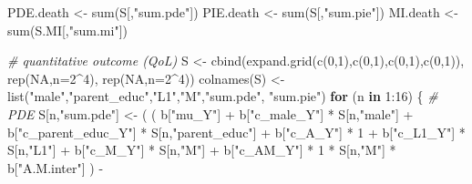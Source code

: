 \documentclass[
]{book}
\newenvironment{Shaded}{\begin{snugshade}}{\end{snugshade}}
\newcommand{\AttributeTok}[1]{\textcolor[rgb]{0.77,0.63,0.00}{#1}}
\newcommand{\CommentTok}[1]{\textcolor[rgb]{0.56,0.35,0.01}{\textit{#1}}}
\newcommand{\ConstantTok}[1]{\textcolor[rgb]{0.00,0.00,0.00}{#1}}
\newcommand{\ControlFlowTok}[1]{\textcolor[rgb]{0.13,0.29,0.53}{\textbf{#1}}}
\newcommand{\DecValTok}[1]{\textcolor[rgb]{0.00,0.00,0.81}{#1}}
\newcommand{\FunctionTok}[1]{\textcolor[rgb]{0.00,0.00,0.00}{#1}}
\newcommand{\NormalTok}[1]{#1}
\newcommand{\OtherTok}[1]{\textcolor[rgb]{0.56,0.35,0.01}{#1}}
\newcommand{\SpecialCharTok}[1]{\textcolor[rgb]{0.00,0.00,0.00}{#1}}
\newcommand{\StringTok}[1]{\textcolor[rgb]{0.31,0.60,0.02}{#1}}
\begin{document}
\begin{Shaded}
\begin{Highlighting}[]
\NormalTok{  PDE.death }\OtherTok{\textless{}{-}} \FunctionTok{sum}\NormalTok{(S[,}\StringTok{"sum.pde"}\NormalTok{])}
\NormalTok{  PIE.death }\OtherTok{\textless{}{-}} \FunctionTok{sum}\NormalTok{(S[,}\StringTok{"sum.pie"}\NormalTok{])}
\NormalTok{  MI.death }\OtherTok{\textless{}{-}} \FunctionTok{sum}\NormalTok{(S.MI[,}\StringTok{"sum.mi"}\NormalTok{])}
  
  
  \CommentTok{\# quantitative outcome (QoL)}
\NormalTok{  S }\OtherTok{\textless{}{-}} \FunctionTok{cbind}\NormalTok{(}\FunctionTok{expand.grid}\NormalTok{(}\FunctionTok{c}\NormalTok{(}\DecValTok{0}\NormalTok{,}\DecValTok{1}\NormalTok{),}\FunctionTok{c}\NormalTok{(}\DecValTok{0}\NormalTok{,}\DecValTok{1}\NormalTok{),}\FunctionTok{c}\NormalTok{(}\DecValTok{0}\NormalTok{,}\DecValTok{1}\NormalTok{),}\FunctionTok{c}\NormalTok{(}\DecValTok{0}\NormalTok{,}\DecValTok{1}\NormalTok{)), }\FunctionTok{rep}\NormalTok{(}\ConstantTok{NA}\NormalTok{,}\AttributeTok{n=}\DecValTok{2}\SpecialCharTok{\^{}}\DecValTok{4}\NormalTok{), }\FunctionTok{rep}\NormalTok{(}\ConstantTok{NA}\NormalTok{,}\AttributeTok{n=}\DecValTok{2}\SpecialCharTok{\^{}}\DecValTok{4}\NormalTok{))}
  \FunctionTok{colnames}\NormalTok{(S) }\OtherTok{\textless{}{-}} \FunctionTok{list}\NormalTok{(}\StringTok{"male"}\NormalTok{,}\StringTok{"parent\_educ"}\NormalTok{,}\StringTok{"L1"}\NormalTok{,}\StringTok{"M"}\NormalTok{,}\StringTok{"sum.pde"}\NormalTok{, }\StringTok{"sum.pie"}\NormalTok{)}
  \ControlFlowTok{for}\NormalTok{ (n }\ControlFlowTok{in} \DecValTok{1}\SpecialCharTok{:}\DecValTok{16}\NormalTok{) \{}
    \CommentTok{\# PDE }
\NormalTok{    S[n,}\StringTok{"sum.pde"}\NormalTok{] }\OtherTok{\textless{}{-}}\NormalTok{ ( ( b[}\StringTok{"mu\_Y"}\NormalTok{] }\SpecialCharTok{+} 
\NormalTok{                            b[}\StringTok{"c\_male\_Y"}\NormalTok{] }\SpecialCharTok{*}\NormalTok{ S[n,}\StringTok{"male"}\NormalTok{] }\SpecialCharTok{+} 
\NormalTok{                            b[}\StringTok{"c\_parent\_educ\_Y"}\NormalTok{] }\SpecialCharTok{*}\NormalTok{ S[n,}\StringTok{"parent\_educ"}\NormalTok{] }\SpecialCharTok{+} 
\NormalTok{                            b[}\StringTok{"c\_A\_Y"}\NormalTok{] }\SpecialCharTok{*} \DecValTok{1} \SpecialCharTok{+} 
\NormalTok{                            b[}\StringTok{"c\_L1\_Y"}\NormalTok{] }\SpecialCharTok{*}\NormalTok{ S[n,}\StringTok{"L1"}\NormalTok{] }\SpecialCharTok{+}
\NormalTok{                            b[}\StringTok{"c\_M\_Y"}\NormalTok{] }\SpecialCharTok{*}\NormalTok{ S[n,}\StringTok{"M"}\NormalTok{] }\SpecialCharTok{+}
\NormalTok{                            b[}\StringTok{"c\_AM\_Y"}\NormalTok{] }\SpecialCharTok{*} \DecValTok{1} \SpecialCharTok{*}\NormalTok{ S[n,}\StringTok{"M"}\NormalTok{] }\SpecialCharTok{*}\NormalTok{ b[}\StringTok{"A.M.inter"}\NormalTok{] ) }\SpecialCharTok{{-}} 

\end{Highlighting}
\end{Shaded}
\end{document}
